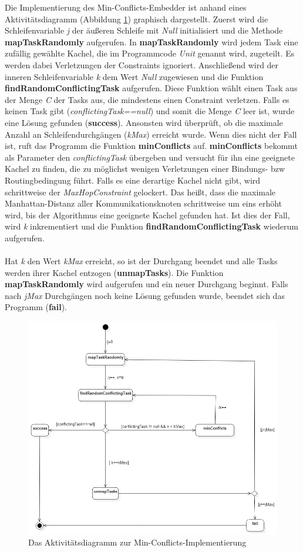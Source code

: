 Die Implementierung des Min-Conflicts-Embedder ist anhand eines  Aktivitätsdiagramm (Abbildung \ref{fig:minConflictsAkti}) graphisch dargestellt. Zuerst wird die Schleifenvariable \textit{j} der äußeren Schleife mit \textit{Null} initialisiert und die Methode \textbf{mapTaskRandomly} aufgerufen. In \textbf{mapTaskRandomly} wird jedem Task eine zufällig gewählte Kachel, die im Programmcode \textit{Unit} genannt wird, zugeteilt. Es werden dabei Verletzungen der Constraints ignoriert. Anschließend wird der inneren Schleifenvariable \textit{k} dem Wert \textit{Null} zugewiesen und die Funktion \textbf{findRandomConflictingTask} aufgerufen. Diese Funktion wählt einen Task aus der Menge \textit{C} der Tasks aus, die mindestens einen Constraint verletzen. Falls es keinen Task gibt (\textit{conflictingTask==null}) und somit die Menge \textit{C} leer ist, wurde eine Lösung gefunden (\textbf{success}). Ansonsten wird überprüft, ob die maximale Anzahl an Schleifendurchgängen (\textit{kMax}) erreicht wurde. Wenn dies nicht der Fall ist, ruft das Programm die Funktion \textbf{minConflicts} auf. \textbf{minConflicts} bekommt als Parameter den \textit{conflictingTask} übergeben und versucht für ihn eine geeignete Kachel zu finden, die zu möglichst wenigen Verletzungen einer Bindungs- bzw Routingbedingung führt. Falls es eine derartige Kachel nicht gibt, wird schrittweise der \textit{MaxHopConstraint} gelockert. Das heißt, dass die maximale Manhattan-Distanz aller Kommunikationsknoten schrittweise um eins erhöht wird, bis der Algorithmus eine geeignete Kachel gefunden hat. Ist dies der Fall, wird \textit{k} inkrementiert und die Funktion \textbf{findRandomConflictingTask} wiederum aufgerufen. \\
\\
Hat \textit{k} den Wert \textit{kMax} erreicht, so ist der Durchgang beendet und alle Tasks werden ihrer Kachel entzogen (\textbf{unmapTasks}). Die Funktion \textbf{mapTaskRandomly} wird aufgerufen und ein neuer Durchgang beginnt. Falls nach \textit{jMax} Durchgängen noch keine Lösung gefunden wurde, beendet sich das Programm (\textbf{fail}).

\begin{figure}[H]\centering
  \includegraphics[width = 150mm]{bilder/minAkti.jpg}
  \caption{Das Aktivitätsdiagramm zur Min-Conflicts-Implementierung}\label{fig:minConflictsAkti}
\end{figure}
